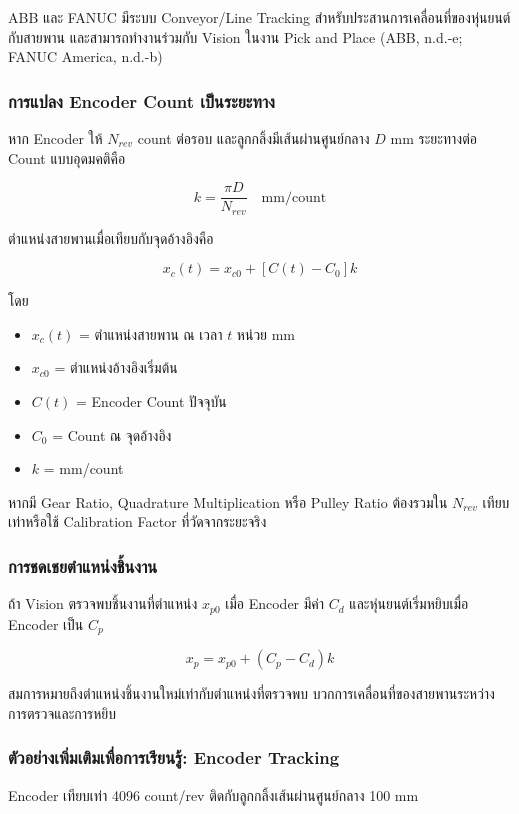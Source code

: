 ABB และ FANUC มีระบบ Conveyor/Line Tracking สำหรับประสานการเคลื่อนที่ของหุ่นยนต์กับสายพาน และสามารถทำงานร่วมกับ Vision ในงาน Pick and Place (ABB, n.d.-e; FANUC America, n.d.-b)

\subsubsection{การแปลง Encoder Count เป็นระยะทาง}

หาก Encoder ให้ $N_{rev}$ count ต่อรอบ และลูกกลิ้งมีเส้นผ่านศูนย์กลาง $D$ mm ระยะทางต่อ Count แบบอุดมคติคือ

\[
k=\frac{\pi D}{N_{rev}}\quad \text{mm/count}
\]

ตำแหน่งสายพานเมื่อเทียบกับจุดอ้างอิงคือ

\[
x_c(t)=x_{c0}+[C(t)-C_0]k
\]

โดย

\begin{itemize}
    \item $x_c(t)$ = ตำแหน่งสายพาน ณ เวลา $t$ หน่วย mm
    \item $x_{c0}$ = ตำแหน่งอ้างอิงเริ่มต้น
    \item $C(t)$ = Encoder Count ปัจจุบัน
    \item $C_0$ = Count ณ จุดอ้างอิง
    \item $k$ = mm/count
\end{itemize}

หากมี Gear Ratio, Quadrature Multiplication หรือ Pulley Ratio ต้องรวมใน $N_{rev}$ เทียบเท่าหรือใช้ Calibration Factor ที่วัดจากระยะจริง

\subsubsection{การชดเชยตำแหน่งชิ้นงาน}

ถ้า Vision ตรวจพบชิ้นงานที่ตำแหน่ง $x_{p0}$ เมื่อ Encoder มีค่า $C_d$ และหุ่นยนต์เริ่มหยิบเมื่อ Encoder เป็น $C_p$

\[
x_p=x_{p0}+(C_p-C_d)k
\]

สมการหมายถึงตำแหน่งชิ้นงานใหม่เท่ากับตำแหน่งที่ตรวจพบ บวกการเคลื่อนที่ของสายพานระหว่างการตรวจและการหยิบ

\subsubsection{ตัวอย่างเพิ่มเติมเพื่อการเรียนรู้: Encoder Tracking}

Encoder เทียบเท่า 4096 count/rev ติดกับลูกกลิ้งเส้นผ่านศูนย์กลาง 100 mm

